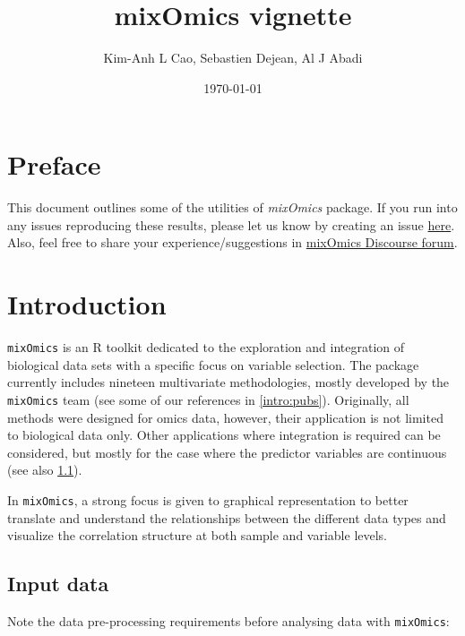 \documentclass[]{book}
\title{mixOmics vignette}
\author{Kim-Anh L Cao, Sebastien Dejean, Al J Abadi}
\date{\today}
\begin{document}
\maketitle

{
\setcounter{tocdepth}{1}
\tableofcontents
}
\hypertarget{preface}{%
\chapter*{Preface}\label{preface}}

This document outlines some of the utilities of \emph{mixOmics} package. If you run into any issues reproducing these results, please let us know by creating an issue \href{https://github.com/mixOmicsTeam/Bookdown/issues}{here}. Also, feel free to share your experience/suggestions in \href{https://mixomics-users.discourse.group/}{mixOmics Discourse forum}.

\hypertarget{intro}{%
\chapter{Introduction}\label{intro}}

\texttt{mixOmics} is an R toolkit dedicated to the exploration and integration of biological data sets with a specific focus on variable selection. The package currently includes nineteen multivariate methodologies, mostly developed by the \texttt{mixOmics} team (see some of our references in \ref{intro:pubs}). Originally, all methods were designed for omics data, however, their application is not limited to biological data only. Other applications where integration is required can be considered, but mostly for the case where the predictor variables are continuous (see also \ref{intro:datatypes}).

In \texttt{mixOmics}, a strong focus is given to graphical representation to better translate and understand the relationships between the different data types and visualize the correlation structure at both sample and variable levels.

\hypertarget{intro:datatypes}{%
\section{Input data}\label{intro:datatypes}}

Note the data pre-processing requirements before analysing data with \texttt{mixOmics}:
\end{document}
